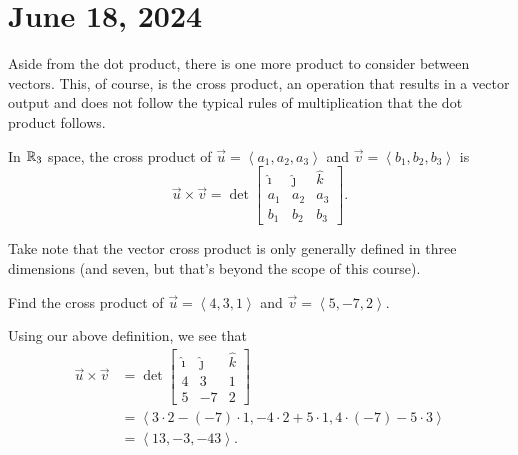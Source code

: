 \documentclass[11pt]{scrartcl}
\begin{document}
\section{June 18, 2024}

Aside from the dot product, there is one more product to consider between vectors. This, of course, is the cross product, an operation that results in a vector output and does not follow the typical rules of multiplication that the dot product follows.

\begin{definition}
    In $\mathbb R_{3}$ space, the cross product of $\vec{u} = \left<a_{1}, a_{2}, a_{3}\right>$ and $\vec{v} = \left<b_{1}, b_{2}, b_{3}\right>$ is
    \[\vec{u} \times \vec{v} = \det \begin{bmatrix} \hat{\imath} & \hat{\jmath} & \hat{k} \\ a_{1} & a_{2} & a_{3} \\ b_{1} & b_{2} & b_{3} \end{bmatrix}.\]
\end{definition}

\begin{remark}
    Take note that the vector cross product is only generally defined in three dimensions (and seven, but that's beyond the scope of this course).
\end{remark}

\begin{example}
    Find the cross product of $\vec{u} = \left<4, 3, 1\right>$ and $\vec{v} = \left<5, -7, 2\right>$.

    \begin{soln}
        Using our above definition, we see that
        \begin{align*}
            \vec{u} \times \vec{v} &= \det \begin{bmatrix}
                \hat{\imath} & \hat{\jmath} & \hat{k} \\
                4 & 3 & 1 \\
                5 & -7 & 2
            \end{bmatrix} \\
            &= \left<3 \cdot 2 - (-7) \cdot 1, -4 \cdot 2 + 5 \cdot 1, 4 \cdot (-7) - 5 \cdot 3\right> \\
            &= \left<13, -3, -43\right>.
        \end{align*}
    \end{soln}
\end{example}
\end{document}
